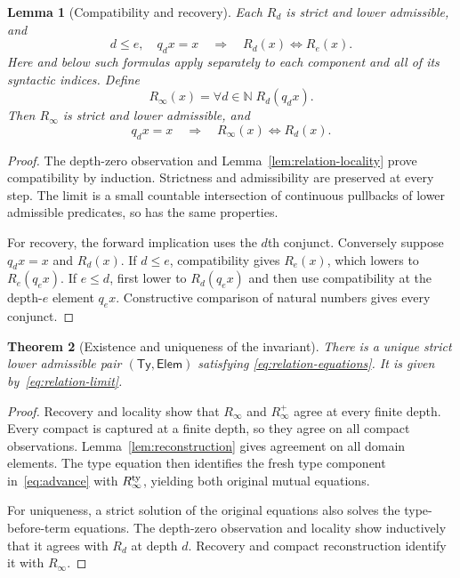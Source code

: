 \documentclass[11pt,a4paper]{article}
\newtheorem{theorem}{Theorem}[section]
\newtheorem{lemma}[theorem]{Lemma}
\theoremstyle{definition}
\theoremstyle{remark}
\newcommand{\N}{\mathbb N}
\newcommand{\TyRel}{\mathsf{Ty}}
\newcommand{\ElemRel}{\mathsf{Elem}}
\begin{document}
\begin{lemma}[Compatibility and recovery]\label{lem:relation-recovery}
Each $R_d$ is strict and lower admissible, and
\[
 d\leq e,\quad q_dx=x
 \quad\Longrightarrow\quad R_d(x)\Longleftrightarrow R_e(x).
\]
Here and below such formulas apply separately to each component and
all of its syntactic indices. Define
\begin{equation}\label{eq:relation-limit}
 R_\infty(x)=\forall d\in\N\;R_d(q_dx).
\end{equation}
Then $R_\infty$ is strict and lower admissible, and
\[
 q_dx=x\quad\Longrightarrow\quad
 R_\infty(x)\Longleftrightarrow R_d(x).
\]
\end{lemma}
\begin{proof}
The depth-zero observation and Lemma~\ref{lem:relation-locality} prove
compatibility by induction. Strictness and admissibility are preserved
at every step. The limit is a small countable intersection of continuous
pullbacks of lower admissible predicates, so has the same properties.

For recovery, the forward implication uses the $d$th conjunct. Conversely
suppose $q_dx=x$ and $R_d(x)$. If $d\leq e$, compatibility gives $R_e(x)$,
which lowers to $R_e(q_ex)$. If $e\leq d$, first lower to $R_d(q_ex)$
and then use compatibility at the depth-$e$ element $q_ex$.
Constructive comparison of natural numbers gives every conjunct.
\end{proof}

\begin{theorem}[Existence and uniqueness of the invariant]\label{thm:independent-invariant}
There is a unique strict lower admissible pair $(\TyRel,\ElemRel)$ satisfying
\eqref{eq:relation-equations}. It is given by~\eqref{eq:relation-limit}.
\end{theorem}
\begin{proof}
Recovery and locality show that $R_\infty$ and $R_\infty^+$ agree at every
finite depth. Every compact is captured at a finite depth, so they agree
on all compact observations. Lemma~\ref{lem:reconstruction} gives agreement
on all domain elements. The type equation then identifies the fresh type
component in~\eqref{eq:advance} with $R_\infty^{\rm ty}$, yielding both
original mutual equations.

For uniqueness, a strict solution of the original equations also solves
the type-before-term equations. The depth-zero observation and locality
show inductively that it agrees with $R_d$ at depth $d$. Recovery and
compact reconstruction identify it with $R_\infty$.
\end{proof}
\end{document}
